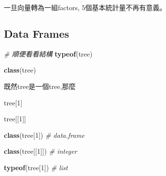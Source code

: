 \documentclass[]{book}
\newenvironment{Shaded}{\begin{snugshade}}{\end{snugshade}}
\newcommand{\CommentTok}[1]{\textcolor[rgb]{0.56,0.35,0.01}{\textit{#1}}}
\newcommand{\DecValTok}[1]{\textcolor[rgb]{0.00,0.00,0.81}{#1}}
\newcommand{\KeywordTok}[1]{\textcolor[rgb]{0.13,0.29,0.53}{\textbf{#1}}}
\newcommand{\NormalTok}[1]{#1}
\theoremstyle{definition}
\theoremstyle{definition}
\theoremstyle{definition}
\theoremstyle{remark}
\begin{document}
一旦向量轉為一組factors, 5個基本統計量不再有意義。

\hypertarget{data-frames}{%
\subsection{Data Frames}\label{data-frames}}

\begin{Shaded}
\begin{Highlighting}[]
\CommentTok{# 順便看看結構}
\KeywordTok{typeof}\NormalTok{(tree)}
\end{Highlighting}
\end{Shaded}

\begin{Shaded}
\begin{Highlighting}[]
\KeywordTok{class}\NormalTok{(tree)}
\end{Highlighting}
\end{Shaded}

既然tree是一個tree,那麼

\begin{Shaded}
\begin{Highlighting}[]
\NormalTok{tree[}\DecValTok{1}\NormalTok{]}
\end{Highlighting}
\end{Shaded}

\begin{Shaded}
\begin{Highlighting}[]
\NormalTok{tree[[}\DecValTok{1}\NormalTok{]] }
\end{Highlighting}
\end{Shaded}

\begin{Shaded}
\begin{Highlighting}[]

\KeywordTok{class}\NormalTok{(tree[}\DecValTok{1}\NormalTok{]) }\CommentTok{# data.frame}
\end{Highlighting}
\end{Shaded}

\begin{Shaded}
\begin{Highlighting}[]
\KeywordTok{class}\NormalTok{(tree[[}\DecValTok{1}\NormalTok{]]) }\CommentTok{# integer}
\end{Highlighting}
\end{Shaded}

\begin{Shaded}
\begin{Highlighting}[]
\KeywordTok{typeof}\NormalTok{(tree[}\DecValTok{1}\NormalTok{]) }\CommentTok{# list}
\end{Highlighting}
\end{Shaded}
\end{document}

